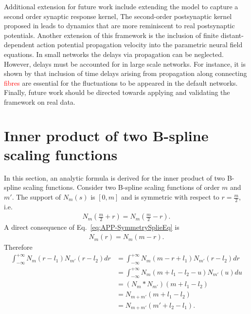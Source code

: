 \documentclass[review,authoryear,3p]{elsarticle}
\newcommand{\parham}[1]{\textcolor{red}{#1}}
\begin{document}
Additional extension for future work include extending the model to capture a second order synaptic response kernel, The second-order postsynaptic kernel proposed in \citet{VanRotterdam1982} leads to dynamics that are more reminiscent to real postsynaptic potentials. Another extension of this framework is the inclusion of finite distant-dependent action potential propagation velocity into the parametric neural field equations. In small networks the delays via propagation can be neglected. However, delays must be accounted for in large scale networks. For instance, it is shown by \citet{Ghosh2008} that inclusion of time delays arising from propagation along connecting \parham{fibres} are essential for the fluctuations to be appeared in the default networks. Finally, future work should be directed towards applying and validating the framework on real data.

\newpage
\appendix
\section{Inner product of two B-spline scaling functions}\label{ap:InnerProductOfBsplines}
In this section, an analytic formula is derived for the inner product of two B-spline scaling functions. Consider two B-spline scaling functions of order $m$ and $m'$. The support of $N_m\left(s\right)$ is $\left[ 0,m\right]$ and  is symmetric with respect to $r=\frac{m}{2}$, i.e.
\begin{align}\label{eq:APP-SymmetrySplieEq}
 N_{m}\left(\frac{m}{2}+r\right)=N_{m}\left(\frac{m}{2}-r\right).
\end{align}
A direct consequence of Eq.~\eqref{eq:APP-SymmetrySplieEq} is 
\begin{align}
 N_{m}\left(r\right)=N_{m}\left(m-r\right).
\end{align}
Therefore
\begin{align}
\int_{-\infty}^{+\infty}N_{m}\left(r-l_{1}\right)N_{m'}\left(r-l_{2}\right)dr&=\int_{-\infty}^{+\infty}N_{m}\left(m-r+l_{1}\right)N_{m'}\left(r-l_{2}\right)dr \nonumber \\
&=\int_{-\infty}^{+\infty}N_{m}\left(m+l_{1}-l_{2}-u\right)N_{m'}\left(u\right)du \nonumber \\
&=\left(N_m \ast N_{m'}\right) \left(m+l_{1}-l_{2}\right) \nonumber \\
&=N_{m+m'}\left(m+l_{1}-l_{2}\right) \nonumber \\
&=N_{m+m'}\left(m'+l_{2}-l_{1}\right).
\end{align}
\end{document}
